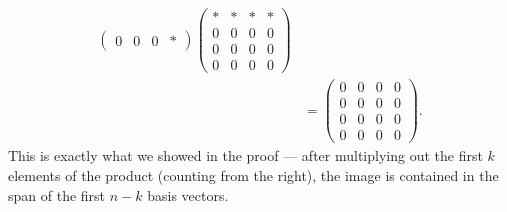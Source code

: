 \documentclass[a4paper]{article}
\begin{document}
\begin{align*}
\begin{pmatrix}
    0 & 0 & 0 & *
  \end{pmatrix}
  \begin{pmatrix}
    * & * & * & *\\
    0 & 0 & 0 & 0\\
    0 & 0 & 0 & 0\\
    0 & 0 & 0 & 0
  \end{pmatrix}\\
  &=
  \begin{pmatrix}
    0 & 0 & 0 & 0\\
    0 & 0 & 0 & 0\\
    0 & 0 & 0 & 0\\
    0 & 0 & 0 & 0
  \end{pmatrix}.
\end{align*}
This is exactly what we showed in the proof --- after multiplying out the first $k$ elements of the product (counting from the right), the image is contained in the span of the first $n - k$ basis vectors.
\end{document}
